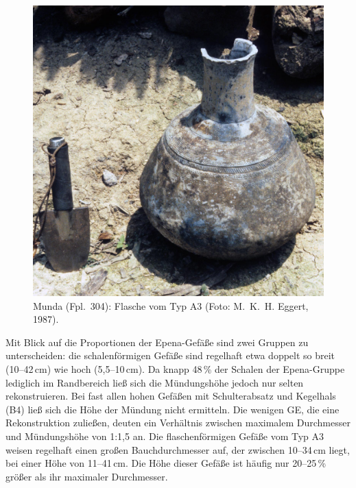 \begin{figure}
	\begin{minipage}[b]{\columnwidth}
		\includegraphics[width=\textwidth]{fig/MUN87-101_E87-036-3.jpg}
	\end{minipage}\hfill
	\begin{minipage}[b]{\columnwidth}
		\caption{Munda (Fpl.~304): Flasche vom Typ A3 (Foto: M.~K.~H. Eggert, 1987).}\label{fig:MUN87-101_EPE-Flasche}
	\end{minipage}
\end{figure}

Mit Blick auf die Proportionen der Epena-Gefäße sind zwei Gruppen zu unterscheiden: die schalenförmigen Gefäße sind regelhaft etwa doppelt so breit (10--42\,cm) wie hoch (5,5--10\,cm). Da knapp 48\,\% der Schalen der Epena-Gruppe lediglich im Randbereich ließ sich die Mündungshöhe jedoch nur selten rekonstruieren. Bei fast allen hohen Gefäßen mit Schulterabsatz und Kegelhals (B4) ließ sich die Höhe der Mündung nicht ermitteln. Die wenigen GE, die eine Rekonstruktion zuließen, deuten ein Verhältnis zwischen maximalem Durchmesser und Mündungshöhe von 1:1,5 an. Die flaschenförmigen Gefäße vom Typ A3 weisen regelhaft einen großen Bauchdurchmesser auf, der zwischen 10--34\,cm liegt, bei einer Höhe von 11--41\,cm. Die Höhe dieser Gefäße ist häufig nur 20--25\,\% größer als ihr maximaler Durchmesser.

